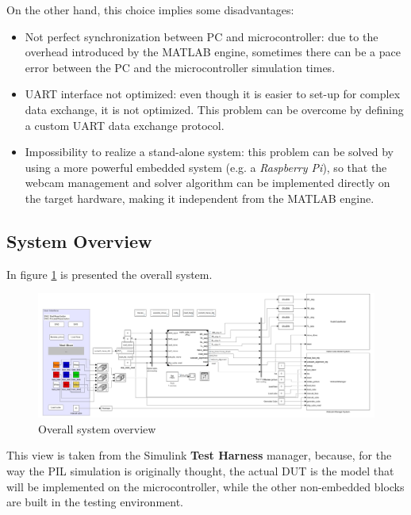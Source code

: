\documentclass{report}
\begin{document}
On the other hand, this choice implies some disadvantages:
\begin{itemize}
    \item Not perfect synchronization between PC and microcontroller: due to the overhead introduced by the MATLAB engine, sometimes there can be a pace error between the PC and the microcontroller simulation times.
    \item UART interface not optimized: even though it is easier to set-up for complex data exchange, it is not optimized. This problem can be overcome by defining a custom UART data exchange protocol.
    \item Impossibility to realize a stand-alone system: this problem can be solved by using a more powerful embedded system (e.g. a \textit{Raspberry Pi}), so that the webcam management and solver algorithm can be implemented directly on the target hardware, making it independent from the MATLAB engine.
\end{itemize}

\subsection{System Overview}
In figure \ref{fig:overall_system} is presented the overall system.

\begin{figure}[h]
    \centering
    \includegraphics[width=1.0\linewidth]{images/PIL_system/test_harness.jpg}
    \caption{Overall system overview}
    \label{fig:overall_system}
\end{figure}

This view is taken from the Simulink \textbf{Test Harness} manager, because, for the way the PIL simulation is originally thought, the actual DUT is the model that will be implemented on the microcontroller, while the other non-embedded blocks are built in the testing environment.
\end{document}
